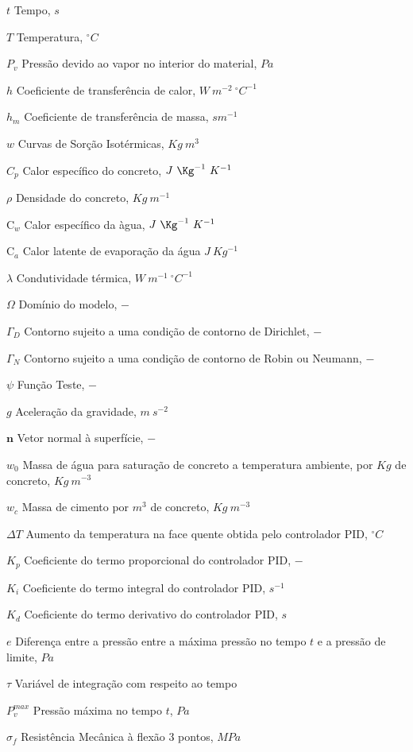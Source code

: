 \documentclass[
	12pt,				%
	openrany,			%
	oneside,			%
	a4paper,			%
	chapter=TITLE,		%
	english,			%
	french,				%
	spanish,			%
	brazil,				%
	hyphens,
  oldfontcommands]{abntex2}
\theoremstyle{definition}
\newcommand{\C}{\bm{\mathrm{C}}}
\theoremstyle{definition}
\begin{document}
\begin{simbolos}
  \item[$ t $] Tempo, $s$
  \item[$ T $] Temperatura, $^{\circ}C$
  \item[$ P_v $] Pressão devido ao vapor no interior do material, $Pa$
  \item[$ h $] Coeficiente de transferência de calor, $W \ m^{-2} \
    ^{\circ}C^{-1}$
  \item[$ h_m $] Coeficiente de transferência de massa, $s m^{-1}$
  \item[$ w $] Curvas de Sorção Isotérmicas, $Kg \ m^3$
  \item[$ C_p $] Calor específico do concreto, $J \ \Kg^{-1} \ K^{-1}$
  \item[$ \rho $]  Densidade do concreto, $Kg \ m^{-1}$
  \item[$ \C_w $]  Calor específico da àgua, $J \ \Kg^{-1} \ K^{-1}$
  \item[$ \C_a $] Calor latente de evaporação da água $J \ Kg^{-1}$
  \item[$ \lambda $] Condutividade térmica, $W \ m^{-1} \ ^{\circ}C^{-1}$
  \item[$ \Omega $] Domínio do modelo, $-$ 
  \item[$ \Gamma_D $] Contorno sujeito a uma condição de contorno de Dirichlet, $-$
  \item[$ \Gamma_N $] Contorno sujeito a uma condição de contorno de Robin ou
    Neumann, $-$
  \item[$ \psi $] Função Teste, $-$
  \item[$ g $] Aceleração da gravidade, $m \ s^{-2}$
  \item[$ \mathbf{n} $] Vetor normal à superfície, $-$
  \item[$ w_0 $]  Massa de água para saturação de concreto a temperatura
    ambiente, por $Kg$ de concreto, $Kg \ m^{-3}$
  \item[$ w_c $]  Massa de cimento por $m^3$ de concreto, $Kg \ m^{-3}$
  \item[$ \Delta T $] Aumento da temperatura na face quente obtida pelo
    controlador PID, $ ^{\circ}C $ 
  \item[$ K_p $] Coeficiente do termo proporcional do controlador PID, $-$
  \item[$ K_i $] Coeficiente do termo integral do controlador PID, $ s^{-1} $
  \item[$ K_d $] Coeficiente do termo derivativo do controlador PID, $ s $
  \item[$ e $] Diferença entre a pressão entre a máxima pressão no tempo $ t $ e a
    pressão de limite, $ Pa $
  \item[$ \tau $] Variável de integração com respeito ao tempo 
  \item[$ P_v^{max} $] Pressão máxima no tempo $t$, $ Pa $
  \item[$ \sigma_f $] Resistência Mecânica à flexão 3 pontos, $MPa$
    
\end{simbolos}
\end{document}
